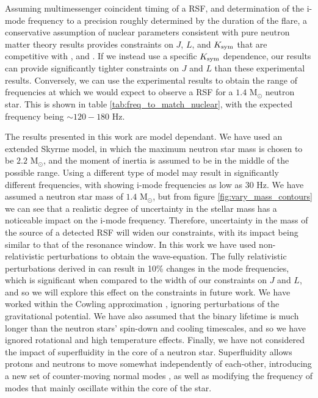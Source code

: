 \documentclass[fleqn,usenatbib]{mnras}
\begin{document}
Assuming multimessenger coincident timing of a RSF, and determination of the i-mode frequency to a precision roughly determined by the duration of the flare, a conservative assumption of nuclear parameters consistent with pure neutron matter theory results provides constraints on $J$, $L$, and $K_{\rm sym}$ that are competitive with \citet{kortelainen2010nuclear}, \citet{chen2010density} and \citet{tsang2009constraints}. If we instead use a specific $K_{\rm sym}$ dependence, our results can provide significantly tighter constraints on $J$ and $L$ than these experimental results. Conversely, we can use the experimental results to obtain the range of frequencies at which we would expect to observe a RSF for a $1.4$ M$_{\odot}$ neutron star. This is shown in table \ref{tab:freq_to_match_nuclear}, with the expected frequency being $\sim 120-180$ Hz.


The results presented in this work are model dependant. We have used an extended Skyrme model, in which the maximum neutron star mass is chosen to be $2.2$ M$_{\odot}$, and the moment of inertia is assumed to be in the middle of the possible range. Using a different type of model may result in significantly different frequencies, with \citet{tsang2012resonant} showing i-mode frequencies as low as $30$ Hz. We have assumed a neutron star mass of $1.4$ M$_{\odot}$, but from figure \ref{fig:vary_mass_contours} we can see that a realistic degree of uncertainty in the stellar mass \citep{abbott2017merger} has a noticeable impact on the i-mode frequency. Therefore, uncertainty in the mass of the source of a detected RSF will widen our constraints, with its impact being similar to that of the resonance window. In this work we have used non-relativistic perturbations to obtain the wave-equation. The fully relativistic perturbations derived in \citet{yoshida2002nonradial} can result in 10\% changes in the mode frequencies, which is significant when compared to the width of our constraints on $J$ and $L$, and so we will explore this effect on the constraints in future work. We have worked within the Cowling approximation \citet{cowling1941non}, ignoring perturbations of the gravitational potential. We have also assumed that the binary lifetime is much longer than the neutron stars' spin-down and cooling timescales, and so we have ignored rotational and high temperature effects. Finally, we have not considered the impact of superfluidity in the core of a neutron star. Superfluidity allows protons and neutrons to move somewhat independently of each-other, introducing a new set of counter-moving normal modes \citet{andersson2001dynamics}, as well as modifying the frequency of modes that mainly oscillate within the core of the star.
\end{document}
